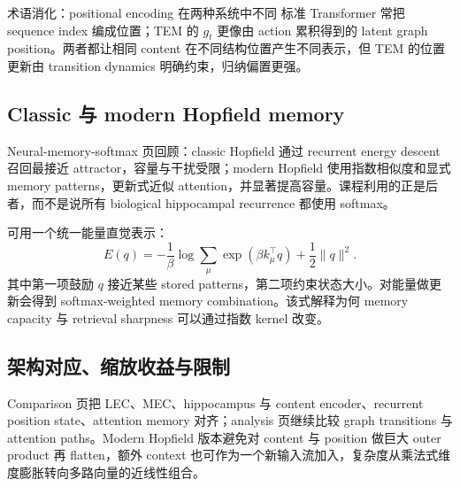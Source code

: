 
\begin{knowledgebox}{术语消化：positional encoding 在两种系统中不同}
标准 Transformer 常把 sequence index 编成位置；TEM 的 $g_t$ 更像由 action 累积得到的 latent graph position。两者都让相同 content 在不同结构位置产生不同表示，但 TEM 的位置更新由 transition dynamics 明确约束，归纳偏置更强。
\end{knowledgebox}

\subsection{Classic 与 modern Hopfield memory}

Neural-memory-softmax 页回顾：classic Hopfield 通过 recurrent energy descent 召回最接近 attractor，容量与干扰受限；modern Hopfield 使用指数相似度和显式 memory patterns，更新式近似 attention，并显著提高容量。课程利用的正是后者，而不是说所有 biological hippocampal recurrence 都使用 softmax。


可用一个统一能量直觉表示：
$$
E(q)=-\frac{1}{\beta}\log\sum_{\mu}\exp(\beta k_\mu^{\top}q)
+\frac{1}{2}\|q\|^2.
$$
其中第一项鼓励 $q$ 接近某些 stored patterns，第二项约束状态大小。对能量做更新会得到 softmax-weighted memory combination。该式解释为何 memory capacity 与 retrieval sharpness 可以通过指数 kernel 改变。

\subsection{架构对应、缩放收益与限制}

Comparison 页把 LEC、MEC、hippocampus 与 content encoder、recurrent position state、attention memory 对齐；analysis 页继续比较 graph transitions 与 attention paths。Modern Hopfield 版本避免对 content 与 position 做巨大 outer product 再 flatten，额外 context 也可作为一个新输入流加入，复杂度从乘法式维度膨胀转向多路向量的近线性组合。



